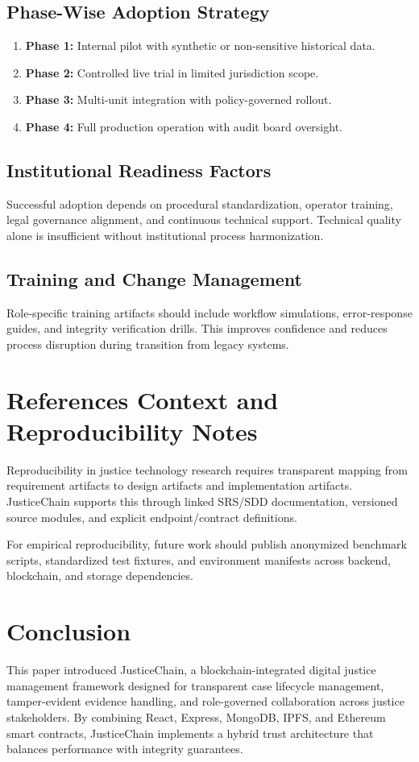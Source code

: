 \documentclass[conference]{IEEEtran}
\begin{document}
\subsection{Phase-Wise Adoption Strategy}
\begin{enumerate}
    \item \textbf{Phase 1:} Internal pilot with synthetic or non-sensitive historical data.
    \item \textbf{Phase 2:} Controlled live trial in limited jurisdiction scope.
    \item \textbf{Phase 3:} Multi-unit integration with policy-governed rollout.
    \item \textbf{Phase 4:} Full production operation with audit board oversight.
\end{enumerate}

\subsection{Institutional Readiness Factors}
Successful adoption depends on procedural standardization, operator training, legal governance alignment, and continuous technical support. Technical quality alone is insufficient without institutional process harmonization.

\subsection{Training and Change Management}
Role-specific training artifacts should include workflow simulations, error-response guides, and integrity verification drills. This improves confidence and reduces process disruption during transition from legacy systems.

\section{References Context and Reproducibility Notes}
Reproducibility in justice technology research requires transparent mapping from requirement artifacts to design artifacts and implementation artifacts. JusticeChain supports this through linked SRS/SDD documentation, versioned source modules, and explicit endpoint/contract definitions.

For empirical reproducibility, future work should publish anonymized benchmark scripts, standardized test fixtures, and environment manifests across backend, blockchain, and storage dependencies.

\section{Conclusion}
This paper introduced JusticeChain, a blockchain-integrated digital justice management framework designed for transparent case lifecycle management, tamper-evident evidence handling, and role-governed collaboration across justice stakeholders. By combining React, Express, MongoDB, IPFS, and Ethereum smart contracts, JusticeChain implements a hybrid trust architecture that balances performance with integrity guarantees.
\end{document}
